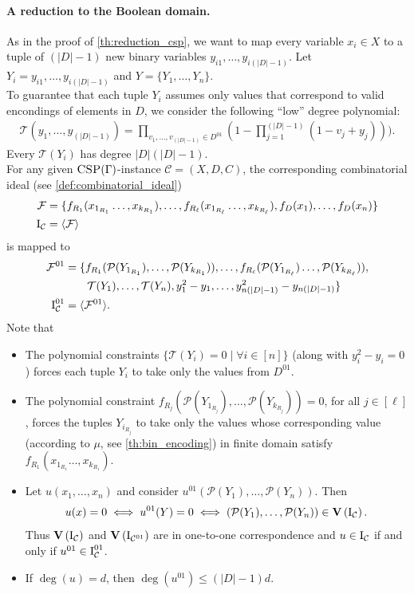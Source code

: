 \documentclass[11pt]{article}
\newcommand{\F}{\mathcal{F}}
\newcommand{\Cc}{\mathcal{C}}
\newcommand{\CSP}{\textsc{CSP}}
\newcommand{\Variety}[1]{{\textbf{V}}\left( #1 \right)}
\newcommand{\I}{\emph{$\rm{I}$}}
\newcommand{\1}{\textbf{1}}
\newcommand{\T}{\mathcal{T}}
\newcommand\p{\mathcal{P}}
\newcommand\uval{{(|D|-1)}}
\begin{document}
\paragraph{A reduction to the Boolean domain.}
As in the proof of \cref{th:reduction_csp}, we want to map every variable $x_i\in X$ to a tuple of $\uval$ new binary variables $y_{i1},\ldots, y_{i\uval}$. Let $Y_i=y_{i1},\ldots, y_{i\uval}$ and $Y=\{Y_1,\ldots, Y_n\}$. \\
%
To guarantee that each tuple $Y_i$ assumes only values that correspond to valid encondings of elements in $D$, we consider the following ``low'' degree polynomial:
\begin{align*}
    \T(y_{1},\ldots, y_{\uval})=\prod_{v_1,\ldots,v_\uval\in D^{01}}(1-\prod_{j=1}^{\uval}(1-v_j+y_j))).
\end{align*}
Every $\T(Y_i)$ has degree $|D|\uval$. \\
%
%
For any given $\CSP(\Gamma)$-instance $\Cc=(X,D,C)$, the corresponding combinatorial ideal  (see \cref{def:combinatorial_ideal})  
%
\begin{align}
    \F&=\{f_{R_1}(x_{1_{R_1}}\ldots,x_{k_{R_1}}),\ldots,f_{R_\ell}(x_{1_{R_\ell}}\ldots,x_{k_{R_\ell}}),f_D(x_1),\ldots,f_D(x_n)\} \label{eq:F}\\
    \I_\Cc&=\langle \F\rangle
\end{align}
%
is mapped to
%
\begin{align}
 \F^{01}&=\{f_{R_1}(\p(Y_{1_{R_1}}),\ldots,\p(Y_{k_{R_1}})),\ldots,f_{R_\ell}(\p(Y_{1_{R_\ell}})\ldots,\p(Y_{k_{R_\ell}})),\nonumber\\ 
&\qquad \T(Y_1), \ldots,\T(Y_n),y_1^2-y_1,\ldots,y_{n\uval}^2-y_{n\uval}\} \label{eq:F01}\\ 
\I_\Cc^{01}&=\langle \F^{01}\rangle.
\end{align}
%
Note that 
\begin{itemize}
    \item The polynomial constraints $\{\T(Y_i)=0\mid \forall i\in [n]\}$ (along with $y_i^2-y_i=0$) forces each tuple $Y_i$ to take only the values from $D^{01}$.
    \item The polynomial constraint  $f_{R_j}\left(\p(Y_{1_{R_j}}),\ldots,\p(Y_{k_{R_j}})\right)=0$, for all $j\in [\ell]$, forces the tuples $Y_{i_{R_j}}$ to take only the values whose corresponding value (according to $\mu$, see \cref{th:bin_encoding}) in finite domain satisfy $f_{R_1}(x_{1_{R_1}}\ldots,x_{k_{R_1}})$.
    \item Let $u(x_1, \dots, x_n)$ and consider $u^{01}(\p(Y_1), \dots, \p(Y_n))$. Then
    \begin{align*}
        u(x) = 0 \iff u^{01}(Y) = 0 \iff (\p(Y_1), \dots, \p(Y_n)) \in \Variety{\I_\Cc}.
    \end{align*}
    Thus $\Variety{\I_\Cc}$ and $\Variety{\I_{\Cc^{01}}}$ are in one-to-one correspondence and $u \in \I_\Cc$ if and only if $u^{01} \in \I_{\Cc}^{01}$.
    \item If $\deg(u) = d$, then $\deg(u^{01}) \leq \uval d$.
\end{itemize}
\end{document}
